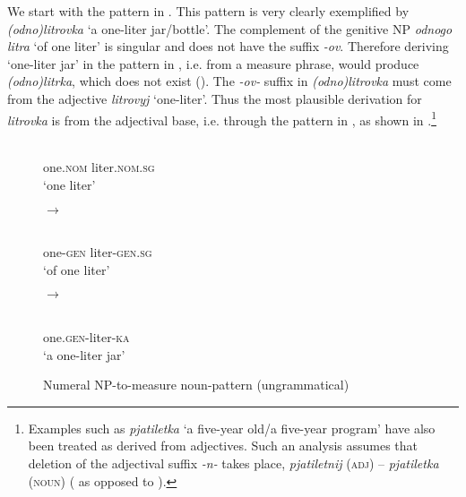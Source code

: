 \documentclass[output=paper]{langscibook}
\begin{document}
We start with the pattern in . This pattern is very clearly exemplified by \textit{(odno)litrovka} `a one-liter jar/bottle'. The complement of the genitive NP \textit{odnogo litra} `of one liter' is singular and does not have the suffix \textit{-ov}. Therefore deriving `one-liter jar' in the pattern in , i.e. from a measure phrase, would produce \textit{(odno)litrka}, which does not exist (). The \textit{-ov-} suffix in \textit{(odno)litrovka} must come from the adjective \textit{litrovyj} `one-liter'. Thus the most plausible derivation for \textit{litrovka} is from the adjectival base, i.e. through the pattern in , as shown in .\footnote{Examples such as \textit{pjatiletka} `a five-year old/a five-year program' have also been treated as derived from adjectives. Such an analysis assumes that deletion of the adjectival suffix \textit{-n-} takes place, \textit{pjatiletnij} (\textsc{adj}) -- \textit{pjatiletka} (\textsc{noun}) (\citealt{Townsend1975} as opposed to \citealt{Vinogradov1960}).}


\begin{figure}\small
\hfill\begin{minipage}{\widthof{\hspace{8pt}one.\textsc{nom} liter.\textsc{nom.sg}}}
\\
\hspace{4pt}one.\textsc{nom} liter.\textsc{nom.sg}\\
\glt \small `one liter'
\end{minipage}\hfill$\rightarrow$\hfill
\begin{minipage}{\widthof{\hspace{12pt}one-\textsc{gen} liter-\textsc{gen.sg}}}
\\
\hspace{8pt}one-\textsc{gen} liter-\textsc{gen.sg}\\
\glt\small `of one liter'
\end{minipage}\hfill$\rightarrow$\hfill
\begin{minipage}{\widthof{* \hspace{12pt}one.\textsc{gen}-liter-\textsc{ka}}}
\\
{} \hspace{8pt}one.\textsc{gen}-liter-\textsc{ka}\\
\glt\small`a one-liter jar'\\
\end{minipage}\hfill
\caption{Numeral NP-to-measure noun-pattern (ungrammatical)}\label{ex:khrizmann:9}
\end{figure}
\end{document}
